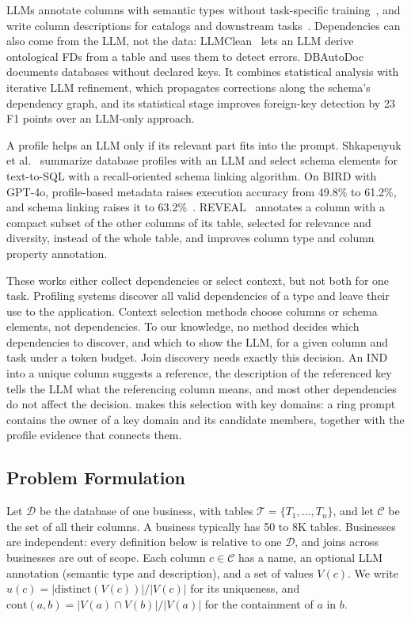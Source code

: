  LLMs annotate columns with semantic types without task-specific training~\cite{DBLP:conf/vldb/KoriniB23,ArcheType}, and write column descriptions for catalogs and downstream tasks~\cite{TACO}.
Dependencies can also come from the LLM, not the data: LLMClean~\cite{LLMClean} lets an LLM derive ontological FDs from a table and uses them to detect errors.
DBAutoDoc~\cite{DBAutoDoc} documents databases without declared keys.
It combines statistical analysis with iterative LLM refinement, which propagates corrections along the schema's dependency graph, and its statistical stage improves foreign-key detection by 23 F1 points over an LLM-only approach.

 A profile helps an LLM only if its relevant part fits into the prompt.
Shkapenyuk et al.~\cite{AutoMetadataT2S} summarize database profiles with an LLM and select schema elements for text-to-SQL with a recall-oriented schema linking algorithm.
On BIRD with GPT-4o, profile-based metadata raises execution accuracy from 49.8\% to 61.2\%, and schema linking raises it to 63.2\%~\cite{AutoMetadataT2S}.
REVEAL~\cite{REVEAL} annotates a column with a compact subset of the other columns of its table, selected for relevance and diversity, instead of the whole table, and improves column type and column property annotation.

 These works either collect dependencies or select context, but not both for one task.
Profiling systems discover all valid dependencies of a type and leave their use to the application.
Context selection methods choose columns or schema elements, not dependencies.
To our knowledge, no method decides which dependencies to discover, and which to show the LLM, for a given column and task under a token budget.
Join discovery needs exactly this decision.
An IND into a unique column suggests a reference, the description of the referenced key tells the LLM what the referencing column means, and most other dependencies do not affect the decision.
\ourmethod makes this selection with key domains: a ring prompt contains the owner of a key domain and its candidate members, together with the profile evidence that connects them.

\subsection{Problem Formulation}
\label{sec:problem}
Let $\mathcal{D}$ be the database of one business, with tables $\mathcal{T} = \{T_1, \ldots, T_n\}$, and let $\mathcal{C}$ be the set of all their columns.
A business typically has 50 to 8K tables.
Businesses are independent: every definition below is relative to one $\mathcal{D}$, and joins across businesses are out of scope.
Each column $c \in \mathcal{C}$ has a name, an optional LLM annotation (semantic type and description), and a set of values $V(c)$.
We write $u(c) = |\mathrm{distinct}(V(c))| / |V(c)|$ for its uniqueness, and $\mathrm{cont}(a, b) = |V(a) \cap V(b)| / |V(a)|$ for the containment of $a$ in $b$.

